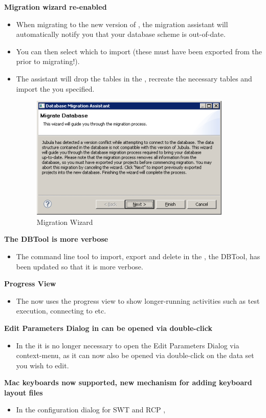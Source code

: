 \textbf{Migration wizard re-enabled}
\begin{itemize}
\item  When migrating to the new version of \app{}, the migration assistant will automatically notify you that your database scheme is out-of-date. 
\item You can then select which \gdprojects{} to import (these must have been exported from the \gddb{} prior to migrating!).
\item The assistant will drop the tables in the \gddb{}, recreate the necessary tables and import the \gdprojects{} you specified.

\begin{figure}[h]
\begin{center}
\includegraphics{52/ps/Migration}
\caption{Migration Wizard}
\label{RNMigration}
\end{center}
\end{figure}

\end{itemize}

\textbf{The DBTool is more verbose}
\begin{itemize}
\item The command line tool to import, export and delete \gdprojects{} in the \gddb{}, the DBTool, has been updated so that it is more verbose.
\end{itemize}

\textbf{Progress View}
\begin{itemize}
\item The \ite{} now  uses the progress view to show longer-running activities such as test execution, connecting to \gdauts{} etc.
\end{itemize}

\textbf{Edit Parameters Dialog in \gddataeditor{} can be opened via double-click}
\begin{itemize}
\item In the \gddataeditor{}  it is no longer necessary to open the Edit Parameters Dialog via context-menu, as it can now also be opened via double-click on the data set you wish to edit.
\end{itemize}


\textbf{Mac keyboards now supported, new mechanism for adding keyboard layout files}
\begin{itemize}
\item In the \gdaut{} configuration dialog for SWT and RCP \gdauts{}, 
\end{itemize}
